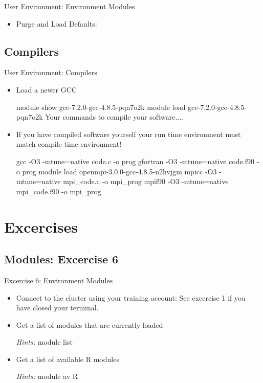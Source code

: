 \begin{frame}[fragile]{User Environment: Environment Modules}
\begin{itemize}
\item{Purge and Load Defaults:}
\smallskip
\end{itemize}
\end{frame}

\subsection{Compilers}
\begin{frame}[fragile]{User Environment: Compilers}
  \begin{itemize}
    \item{Load a newer GCC}
\begin{semiverbatim}
\scriptsize
module show gcc-7.2.0-gcc-4.8.5-pqn7o2k
module load gcc-7.2.0-gcc-4.8.5-pqn7o2k
Your commands to compile your software....
\end{semiverbatim}
\medskip
\item{If you have compiled software yourself your run time environment must match compile time environment!}

\begin{semiverbatim}
\scriptsize
gcc -O3 -mtune=native code.c -o prog
gfortran -O3 -mtune=native code.f90 -o prog
\medskip
module load openmpi-3.0.0-gcc-4.8.5-n2hvjgm
mpicc -O3 -mtune=native mpi_code.c -o mpi_prog
mpif90 -O3 -mtune=native mpi_code.f90 -o mpi_prog
\end{semiverbatim}
\pause
\end{itemize}
\end{frame}

\section{Excercises}

\subsection{Modules: Excercise 6}
\begin{frame}[fragile]{Excercise 6: Environment Modules}
\begin{itemize}
\item{Connect to the cluster using your training account: See excercise 1 if you have closed your terminal. }
\item{Get a list of modules that are currently loaded}
\item[\emph{Hints:}]{\alert{module list}}
\item{Get a list of available R modules}
\item[\emph{Hints:}]{\alert{module av R}}
\end{itemize}
\end{frame}

